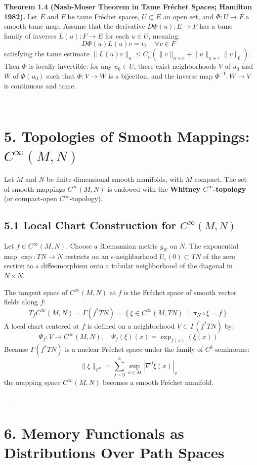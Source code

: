 \documentclass[11pt,twoside,openright]{amsbook}
\begin{document}
\textbf{Theorem 1.4 (Nash-Moser Theorem in Tame Fréchet Spaces; Hamilton 1982).} Let $E$ and $F$ be tame Fréchet spaces, $U \subset E$ an open set, and $\Phi: U \to F$ a smooth tame map. Assume that the derivative $D\Phi(u): E \to F$ has a tame family of inverses $L(u): F \to E$ for each $u \in U$, meaning:
$$D\Phi(u) L(u) v = v, \quad \forall v \in F$$
satisfying the tame estimate $\|L(u) v\|_n \leq C_n (\|v\|_{n+r} + \|u\|_{n+r} \|v\|_0)$. Then $\Phi$ is locally invertible: for any $u_0 \in U$, there exist neighborhoods $V$ of $u_0$ and $W$ of $\Phi(u_0)$ such that $\Phi: V \to W$ is a bijection, and the inverse map $\Phi^{-1}: W \to V$ is continuous and tame.

---

\section{5. Topologies of Smooth Mappings: $C^\infty(M, N)$}

Let $M$ and $N$ be finite-dimensional smooth manifolds, with $M$ compact. The set of smooth mappings $C^\infty(M, N)$ is endowed with the \textbf{Whitney $C^\infty$-topology} (or compact-open $C^\infty$-topology).

\subsection{5.1 Local Chart Construction for $C^\infty(M, N)$}
Let $f \in C^\infty(M, N)$. Choose a Riemannian metric $g_N$ on $N$. The exponential map $\exp: TN \to N$ restricts on an $\epsilon$-neighborhood $U_\epsilon(0) \subset TN$ of the zero section to a diffeomorphism onto a tubular neighborhood of the diagonal in $N \times N$.

The tangent space of $C^\infty(M, N)$ at $f$ is the Fréchet space of smooth vector fields along $f$:
$$T_f C^\infty(M, N) = \Gamma(f^* TN) = \left\{ \xi \in C^\infty(M, TN) \;\middle|\; \pi_N \circ \xi = f \right\}$$
A local chart centered at $f$ is defined on a neighborhood $V \subset \Gamma(f^* TN)$ by:
$$\Psi_f: V \longrightarrow C^\infty(M, N), \quad \Psi_f(\xi)(x) = \exp_{f(x)}(\xi(x))$$
Because $\Gamma(f^* TN)$ is a nuclear Fréchet space under the family of $C^k$-seminorms:
$$\|\xi\|_{C^k} = \sum_{j=0}^k \sup_{x \in M} |\nabla^j \xi(x)|_{g}$$
the mapping space $C^\infty(M, N)$ becomes a smooth Fréchet manifold.

---

\section{6. Memory Functionals as Distributions Over Path Spaces}
\end{document}
